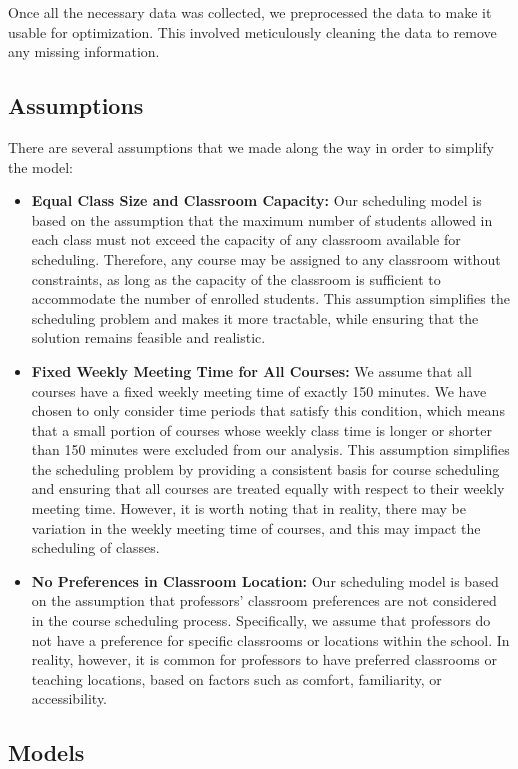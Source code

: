 \documentclass{article}
\begin{document}
Once all the necessary data was collected, we preprocessed the data to make it usable for optimization. This involved meticulously cleaning the data to remove any missing information.

\subsection{Assumptions}

There are several assumptions that we made along the way in order to simplify the model:
\begin{itemize}
  \item \textbf{Equal Class Size and Classroom Capacity:} Our scheduling model is based on the assumption that the maximum number of students allowed in each class must not exceed the capacity of any classroom available for scheduling. Therefore, any course may be assigned to any classroom without constraints, as long as the capacity of the classroom is sufficient to accommodate the number of enrolled students. This assumption simplifies the scheduling problem and makes it more tractable, while ensuring that the solution remains feasible and realistic.
  \item \textbf{Fixed Weekly Meeting Time for All Courses:} We assume that all courses have a fixed weekly meeting time of exactly 150 minutes. We have chosen to only consider time periods that satisfy this condition, which means that a small portion of courses whose weekly class time is longer or shorter than 150 minutes were excluded from our analysis. This assumption simplifies the scheduling problem by providing a consistent basis for course scheduling and ensuring that all courses are treated equally with respect to their weekly meeting time. However, it is worth noting that in reality, there may be variation in the weekly meeting time of courses, and this may impact the scheduling of classes.
  \item \textbf{No Preferences in Classroom Location:} Our scheduling model is based on the assumption that professors' classroom preferences are not considered in the course scheduling process. Specifically, we assume that professors do not have a preference for specific classrooms or locations within the school. In reality, however, it is common for professors to have preferred classrooms or teaching locations, based on factors such as comfort, familiarity, or accessibility.
\end{itemize}


\subsection{Models}
\end{document}
